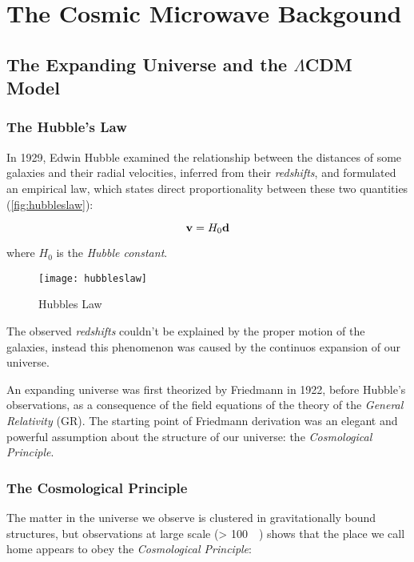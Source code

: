 \chapter{The Cosmic Microwave Backgound}

\section{The Expanding Universe and the \texorpdfstring{$\Lambda$}{LAMBDA-}CDM Model}
\subsection{The Hubble's Law}\label{ss:hubbleslaw}

In 1929, Edwin Hubble examined the relationship between the distances of
some galaxies and their radial velocities, inferred from their \emph{redshifts},
and formulated an empirical law, which states direct proportionality
between these two quantities (\autoref{fig:hubbleslaw}):

\begin{equation}\label{eq:hubble_law}
        \vb{v} = H_0 \vb{d}
\end{equation}

where $H_0$ is the \emph{Hubble constant}.

\begin{figure}
        \centering
        \texttt{[image: hubbleslaw]}
        \caption{Hubbles Law}
        \label{fig:hubbleslaw}
\end{figure}

The observed \emph{redshifts} couldn't be explained by the proper motion of
the galaxies, instead this phenomenon was caused by the continuos expansion
of our universe.

An expanding universe was first theorized by Friedmann in 1922, before Hubble's
observations, as a consequence of the field equations of the theory of the
\emph{General Relativity} (GR). The starting point of Friedmann derivation was
an elegant and powerful assumption about the structure of our universe:
the \emph{Cosmological Principle}.

\subsection{The Cosmological Principle}\label{ss:cosmological_principle}

The matter in the universe we observe is clustered in gravitationally bound
structures, but observations at large scale (\SI{> 100}{\mega\parsec}) shows
that the place we call home appears to obey the \emph{Cosmological
Principle}:  

